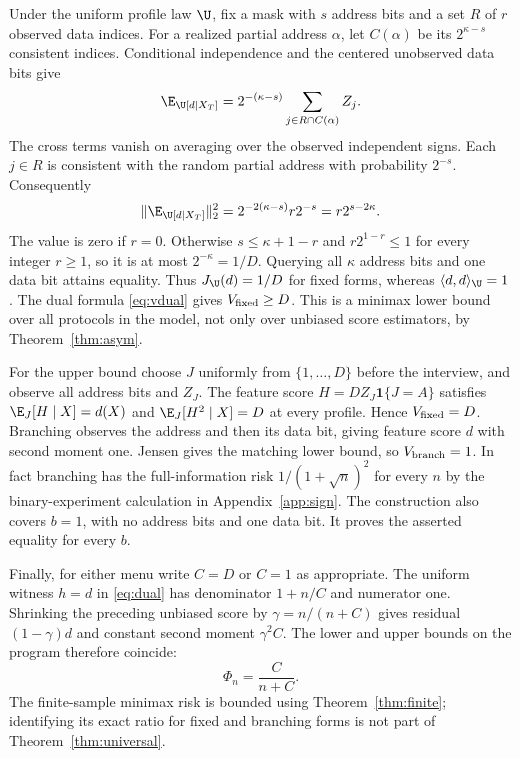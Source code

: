 Under the uniform profile law $\U$, fix a mask with $s$ address bits and a set $R$ of $r$ observed data indices. For a realized partial address $\alpha$, let $C(\alpha)$ be its $2^{\kappa-s}$ consistent indices. Conditional independence and the centered unobserved data bits give
\[
 \E_\U[d\mid X_T]
      =2^{-(\kappa-s)}\sum_{j\in R\cap C(\alpha)} Z_j.
\]
The cross terms vanish on averaging over the observed independent signs. Each $j\in R$ is consistent with the random partial address with probability $2^{-s}$. Consequently
\[
 \|\E_\U[d\mid X_T]\|_2^2
   =2^{-2(\kappa-s)} r2^{-s}=r2^{s-2\kappa}.
\]
The value is zero if $r=0$. Otherwise $s\le \kappa+1-r$ and $r2^{1-r}\le1$ for every integer $r\ge1$, so it is at most $2^{-\kappa}=1/D$. Querying all $\kappa$ address bits and one data bit attains equality. Thus $J_\U(d)=1/D$ for fixed forms, whereas $\langle d,d\rangle_\U=1$. The dual formula \eqref{eq:vdual} gives $V_{\rm fixed}\ge D$. This is a minimax lower bound over all protocols in the model, not only over unbiased score estimators, by Theorem~\ref{thm:asym}.

For the upper bound choose $J$ uniformly from $\{1,\ldots,D\}$ before the interview, and observe all address bits and $Z_J$. The feature score $H=DZ_J\mathbf1\{J=A\}$ satisfies $\E_J[H\mid X]=d(X)$ and $\E_J[H^2\mid X]=D$ at every profile. Hence $V_{\rm fixed}=D$. Branching observes the address and then its data bit, giving feature score $d$ with second moment one. Jensen gives the matching lower bound, so $V_{\rm branch}=1$. In fact branching has the full-information risk $1/(1+\sqrt n)^2$ for every $n$ by the binary-experiment calculation in Appendix~\ref{app:sign}. The construction also covers $b=1$, with no address bits and one data bit. It proves the asserted equality for every $b$.

Finally, for either menu write $C=D$ or $C=1$ as appropriate. The uniform witness $h=d$ in \eqref{eq:dual} has denominator $1+n/C$ and numerator one. Shrinking the preceding unbiased score by $\gamma=n/(n+C)$ gives residual $(1-\gamma)d$ and constant second moment $\gamma^2 C$. The lower and upper bounds on the program therefore coincide:
\[
 \Phi_n=\frac{C}{n+C}.
\]
The finite-sample minimax risk is bounded using Theorem~\ref{thm:finite}; identifying its exact ratio for fixed and branching forms is not part of Theorem~\ref{thm:universal}.

